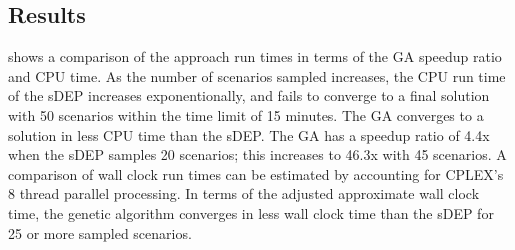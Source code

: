 \documentclass[conference]{IEEEtran}
\begin{document}
\subsection{Results} \label{subsec:results}

 shows a comparison of the approach run times in terms of the GA speedup ratio and CPU time.  As the number of scenarios sampled increases, the CPU run time of the sDEP increases exponentionally, and fails to converge to a final solution with 50 scenarios within the time limit of 15 minutes.  The GA converges to a solution in less CPU time than the sDEP.  The GA has a speedup ratio of 4.4x when the sDEP samples 20 scenarios; this increases to 46.3x with 45 scenarios.  A comparison of wall clock run times can be estimated by accounting for CPLEX's 8 thread parallel processing.  In terms of the adjusted approximate wall clock time, the genetic algorithm converges in less wall clock time than the sDEP for 25 or more sampled scenarios.
\end{document}

